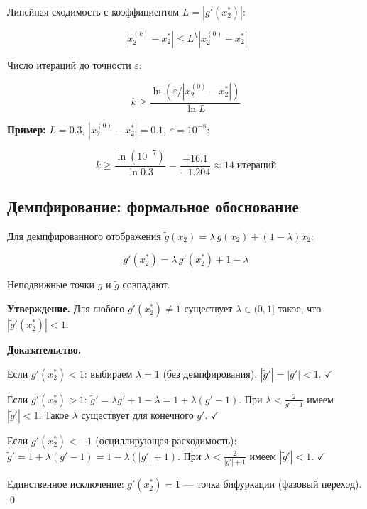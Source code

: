 \documentclass[11pt]{article}
\begin{document}
Линейная сходимость с коэффициентом $L = |g'(x_2^{*})|$:

\begin{equation*}
|x_2^{(k)} - x_2^{*}| \leq L^k |x_2^{(0)} - x_2^{*}|
\end{equation*}

Число итераций до точности $\varepsilon$:

\begin{equation*}
k \geq \frac{\ln(\varepsilon / |x_2^{(0)} - x_2^{*}|)}{\ln L}
\end{equation*}

\textbf{Пример:} $L = 0.3$, $|x_2^{(0)} - x_2^{*}| = 0.1$, $\varepsilon = 10^{-8}$:

\begin{equation*}
k \geq \frac{\ln(10^{-7})}{\ln 0.3} = \frac{-16.1}{-1.204} \approx 14 \;\text{итераций}
\end{equation*}

\subsection{Демпфирование: формальное обоснование}

Для демпфированного отображения $\tilde{g}(x_2) = \lambda \, g(x_2) + (1 - \lambda) x_2$:

\begin{equation*}
\tilde{g}'(x_2^{*}) = \lambda \, g'(x_2^{*}) + 1 - \lambda
\end{equation*}

Неподвижные точки $g$ и $\tilde{g}$ совпадают.

\textbf{Утверждение.} Для любого $g'(x_2^{*}) \neq 1$ существует $\lambda \in (0, 1]$ такое, что $|\tilde{g}'(x_2^{*})| < 1$.

\textbf{Доказательство.}

Если $g'(x_2^{*}) < 1$: выбираем $\lambda = 1$ (без демпфирования), $|\tilde{g}'| = |g'| < 1$. $\checkmark$

Если $g'(x_2^{*}) > 1$: $\tilde{g}' = \lambda g' + 1 - \lambda = 1 + \lambda(g' - 1)$. При $\lambda < \frac{2}{g' + 1}$ имеем $|\tilde{g}'| < 1$. Такое $\lambda$ существует для конечного $g'$. $\checkmark$

Если $g'(x_2^{*}) < -1$ (осциллирующая расходимость): $\tilde{g}' = 1 + \lambda(g' - 1) = 1 - \lambda(|g'| + 1)$. При $\lambda < \frac{2}{|g'| + 1}$ имеем $|\tilde{g}'| < 1$. $\checkmark$

Единственное исключение: $g'(x_2^{*}) = 1$ --- точка бифуркации (фазовый переход). \qed
\end{document}
